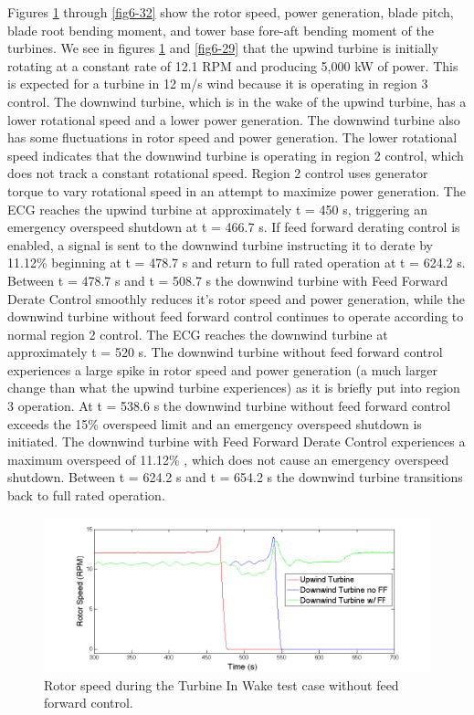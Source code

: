 Figures \ref{fig6-28} through \ref{fig6-32} show the rotor speed, power generation, blade pitch, blade root bending moment, and tower base fore-aft bending moment of the turbines. We see in figures \ref{fig6-28} and \ref{fig6-29} that the upwind turbine is initially rotating at a constant rate of 12.1 RPM and producing 5,000 kW of power. This is expected for a turbine in 12 m/s wind because it is operating in region 3 control. The downwind turbine, which is in the wake of the upwind turbine,  has a lower rotational speed and a lower power generation. The downwind turbine also has some fluctuations in rotor speed and power generation. The lower rotational speed indicates that the downwind turbine is operating in region 2 control, which does not track a constant rotational speed. Region 2 control uses generator torque to vary rotational speed in an attempt to maximize power generation. The ECG reaches the upwind turbine at approximately t = 450 s, triggering an emergency overspeed shutdown at t = 466.7 s. If feed forward derating control is enabled, a signal is sent to the downwind turbine instructing it to derate by 11.12\% beginning at t = 478.7 s and return to full rated operation at t = 624.2 s. Between t = 478.7 s and t = 508.7 s the downwind turbine with Feed Forward Derate Control smoothly reduces it's rotor speed and power generation, while the downwind turbine without feed forward control continues to operate according to normal region 2 control. The ECG reaches the downwind turbine at approximately t = 520 s. The downwind turbine without feed forward control experiences a large spike in rotor speed and power generation (a much larger change than what the upwind turbine experiences) as it is briefly put into region 3 operation. At t = 538.6 s the downwind turbine without feed forward control exceeds the 15\% overspeed limit and an emergency overspeed shutdown is initiated. The downwind turbine with Feed Forward Derate Control experiences a maximum overspeed of 11.12\% , which does not cause an emergency overspeed shutdown. Between t = 624.2 s and t = 654.2 s the downwind turbine transitions back to full rated operation.

\begin{figure}[ht] 
	\centering
		\includegraphics[width = \linewidth]{Figures/ch6Figures/fig6-28.png}
	\caption{Rotor speed during the Turbine In Wake test case without feed forward control.}
	\label{fig6-28}
\end{figure}

